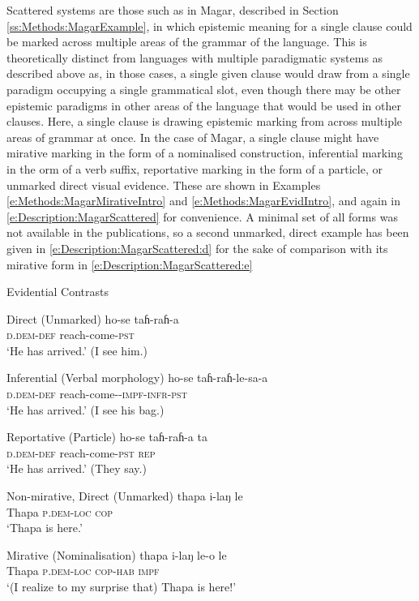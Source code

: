 Scattered systems are those such as in Magar, described in Section \ref{ss:Methods:MagarExample}, in which epistemic meaning for a single clause could be marked across multiple areas of the grammar of the language. This is theoretically distinct from languages with multiple paradigmatic systems as described above as, in those cases, a single given clause would draw from a single paradigm occupying a single grammatical slot, even though there may be other epistemic paradigms in other areas of the language that would be used in other clauses. Here, a single clause is drawing epistemic marking from across multiple areas of grammar at once. In the case of Magar, a single clause might have mirative marking in the form of a nominalised construction, inferential marking in the orm of a verb suffix, reportative marking in the form of a particle, or unmarked direct visual evidence. These are shown in Examples \ref{e:Methods:MagarMirativeIntro} and \ref{e:Methods:MagarEvidIntro}, and again in \ref{e:Description:MagarScattered} for convenience. A minimal set of all forms was not available in the publications, so a second unmarked, direct example has been given in \ref{e:Description:MagarScattered:d} for the sake of comparison with its mirative form in \ref{e:Description:MagarScattered:e}

\begin{exe}
        \ex Evidential Contrasts\label{e:Description:MagarScattered}
        \begin{xlist}
          \ex Direct (Unmarked)
          \gll ho-se taɦ-raɦ-a \\
          \textsc{d.dem-def} reach-come-\textsc{pst} \\
          \glt `He has arrived.' (I see him.)
      
          \ex Inferential (Verbal morphology)
          \gll ho-se taɦ-raɦ-le-sa-a \\
          \textsc{d.dem-def} reach-come-\textsc{-impf-infr-pst} \\
          \glt `He has arrived.' (I see his bag.)
      
          \ex Reportative (Particle)
          \gll ho-se taɦ-raɦ-a ta \\
          \textsc{d.dem-def} reach-come-\textsc{pst} \textsc{rep} \\
          \glt `He has arrived.' (They say.)

          \ex Non-mirative, Direct (Unmarked) \label{e:Description:MagarScattered:d}
          \gll thapa i-laŋ le \\
          Thapa \textsc{p.dem-loc} \textsc{cop} \\
          \glt `Thapa is here.'
      
          \ex Mirative (Nominalisation)\label{e:Description:MagarScattered:e}
          \gll thapa i-laŋ le-o le \\
          Thapa \textsc{p.dem-loc} \textsc{cop-hab} \textsc{impf} \\
          \glt `(I realize to my surprise that) Thapa is here!' 
        \end{xlist}
        \cite[Magar,][480, 497]{GrunowHarsta2008}
      \end{exe}

